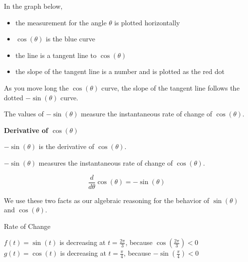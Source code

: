 \documentclass{ximera}
\begin{document}
In the graph below, 

\begin{itemize}
\item the measurement for the angle $\theta$ is plotted horizontally
\item $\cos(\theta)$ is the blue curve
\item the line is a tangent line to $\cos(\theta)$
\item the slope of the tangent line is a number and is plotted as the red dot
\end{itemize}

As you move long the $\cos(\theta)$ curve, the slope of the tangent line follows the dotted $-\sin(\theta)$ curve.



\begin{center}
\end{center}



The values of $-\sin(\theta)$ measure the instantaneous rate of change of $\cos(\theta)$.



\begin{template}  \textbf{\textcolor{purple!65!blue}{Derivative of $\cos(\theta)$}}

\begin{center}
$-\sin(\theta)$ is the derivative of $\cos(\theta)$. 

$-\sin(\theta)$ measures the instantaneous rate of change of $\cos(\theta)$. 
\end{center}


\[
\frac{d}{d\theta} \cos(\theta) = -\sin(\theta)
\]


\end{template}







We use these two facts as our algebraic reasoning for the behavior of $\sin(\theta)$ and $\cos(\theta)$.




\begin{example} Rate of Change



$f(t) = \sin(t)$ is decreasing at $t=\frac{2\pi}{3}$, because $\cos\left( \frac{2\pi}{3} \right) < 0$ \\


$g(t) = \cos(t)$ is decreasing at $t=\frac{\pi}{4}$, because $-\sin\left( \frac{\pi}{4} \right) < 0$

\end{example}
\end{document}
